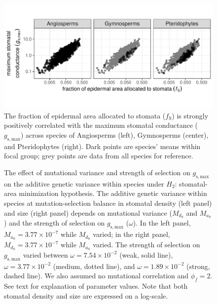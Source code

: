 \documentclass[
  letterpaper,
  DIV=11,
  numbers=noendperiod]{scrartcl}
\begin{document}
\begin{figure}
\caption{The fraction of epidermal area allocated to stomata ($f_\mathrm{S}$) is strongly positively correlated with the maximum stomatal conductance ($g_\mathrm{s,max}$) across species of Angiosperms (left), Gymnosperms (center), and Pteridophytes (right). Dark points are species' means within focal group; grey points are data from all species for reference.}
\includegraphics{figures/fig-gmax-fs.pdf}
\end{figure}

\newpage

\begin{figure}
\caption{The effect of mutational variance and strength of selection on $g_\mathrm{s,max}$ on the additive genetic variance within species under $H_2$: stomatal-area minimization hypothesis. The additive genetic variance within species at mutation-selection balance in stomatal density (left panel) and size (right panel) depends on mutational variance ($M_{d_\mathrm{S}}$ and $M_{a_\mathrm{S}}$) and the strength of selection on $g_\mathrm{s,max}$ ($\omega$). In the left panel, $M_{a_\mathrm{S}} = 3.77 \times 10^{-7}$ while $M_{d_\mathrm{S}}$ varied; in the right panel, $M_{d_\mathrm{S}} = 3.77 \times 10^{-7}$ while $M_{a_\mathrm{S}}$ varied. The strength of selection on $g_\mathrm{s,max}$ varied between $\omega = 7.54 \times 10^{-2}$ (weak, solid line), $\omega = 3.77 \times 10^{-2}$ (medium, dotted line), and $\omega = 1.89 \times 10^{-2}$ (strong, dashed line). We also assumed no mutational correlation and $\phi_f = 2$. See text for explanation of parameter values. Note that both stomatal density and size are expressed on a log-scale.}

\end{figure}

\newpage
\end{document}
